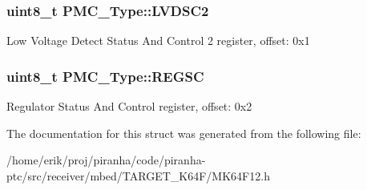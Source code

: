 \subsubsection[{\texorpdfstring{L\+V\+D\+S\+C2}{LVDSC2}}]{ uint8\+\_\+t P\+M\+C\+\_\+\+Type\+::\+L\+V\+D\+S\+C2}\hypertarget{structPMC__Type_abc2abe9e83245fcd84da5a78bbea23ea}{}\label{structPMC__Type_abc2abe9e83245fcd84da5a78bbea23ea}
Low Voltage Detect Status And Control 2 register, offset\+: 0x1 
\subsubsection[{\texorpdfstring{R\+E\+G\+SC}{REGSC}}]{ uint8\+\_\+t P\+M\+C\+\_\+\+Type\+::\+R\+E\+G\+SC}\hypertarget{structPMC__Type_a23fa3c271bf9f25b06221b037553f936}{}\label{structPMC__Type_a23fa3c271bf9f25b06221b037553f936}
Regulator Status And Control register, offset\+: 0x2 

The documentation for this struct was generated from the following file\+:\begin{DoxyCompactItemize}
\item 
/home/erik/proj/piranha/code/piranha-\/ptc/src/receiver/mbed/\+T\+A\+R\+G\+E\+T\+\_\+\+K64\+F/M\+K64\+F12.\+h\end{DoxyCompactItemize}
